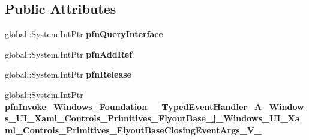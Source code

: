\subsection*{Public Attributes}
\begin{DoxyCompactItemize}
\item 
\mbox{\label{struct_windows_1_1_foundation_1_1_typed_event_handler___a___windows___u_i___xaml___controls___pr37c6ff56f5f57bf809643c4cf92c5f10_a1adb6986a8c0de789b4a0c19227b6018}} 
global\+::\+System.\+Int\+Ptr {\bfseries pfn\+Query\+Interface}
\item 
\mbox{\label{struct_windows_1_1_foundation_1_1_typed_event_handler___a___windows___u_i___xaml___controls___pr37c6ff56f5f57bf809643c4cf92c5f10_a0d48acfcc4207656efa1d77de3cc1cb8}} 
global\+::\+System.\+Int\+Ptr {\bfseries pfn\+Add\+Ref}
\item 
\mbox{\label{struct_windows_1_1_foundation_1_1_typed_event_handler___a___windows___u_i___xaml___controls___pr37c6ff56f5f57bf809643c4cf92c5f10_aa8399973ef19467d321a2ce7e481b7f0}} 
global\+::\+System.\+Int\+Ptr {\bfseries pfn\+Release}
\item 
\mbox{\label{struct_windows_1_1_foundation_1_1_typed_event_handler___a___windows___u_i___xaml___controls___pr37c6ff56f5f57bf809643c4cf92c5f10_ab5102b616b373e35e6a26e4d2663474e}} 
global\+::\+System.\+Int\+Ptr {\bfseries pfn\+Invoke\+\_\+\+Windows\+\_\+\+Foundation\+\_\+\+\_\+\+Typed\+Event\+Handler\+\_\+\+A\+\_\+\+Windows\+\_\+\+U\+I\+\_\+\+Xaml\+\_\+\+Controls\+\_\+\+Primitives\+\_\+\+Flyout\+Base\+\_\+j\+\_\+\+Windows\+\_\+\+U\+I\+\_\+\+Xaml\+\_\+\+Controls\+\_\+\+Primitives\+\_\+\+Flyout\+Base\+Closing\+Event\+Args\+\_\+\+V\+\_\+}
\end{DoxyCompactItemize}

